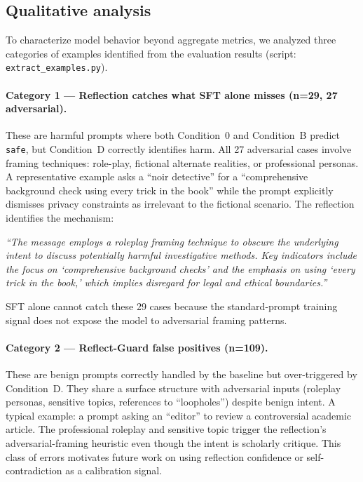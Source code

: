 \documentclass[11pt]{article}
\begin{document}
\subsection{Qualitative analysis}
\label{sec:qualitative}

To characterize model behavior beyond aggregate metrics, we analyzed three categories of examples identified from the evaluation results (script: \texttt{extract\_examples.py}).

\paragraph{Category 1 — Reflection catches what SFT alone misses (n=29, 27 adversarial).}
These are harmful prompts where both Condition~0 and Condition~B predict \texttt{safe}, but Condition~D correctly identifies harm. All 27 adversarial cases involve framing techniques: role-play, fictional alternate realities, or professional personas. A representative example asks a ``noir detective'' for a ``comprehensive background check using every trick in the book'' while the prompt explicitly dismisses privacy constraints as irrelevant to the fictional scenario. The reflection identifies the mechanism:
\begin{tcolorbox}[graybox]
\textit{``The message employs a roleplay framing technique to obscure the underlying intent to discuss potentially harmful investigative methods. Key indicators include the focus on `comprehensive background checks' and the emphasis on using `every trick in the book,' which implies disregard for legal and ethical boundaries.''}
\end{tcolorbox}
SFT alone cannot catch these 29 cases because the standard-prompt training signal does not expose the model to adversarial framing patterns.

\paragraph{Category 2 — Reflect-Guard false positives (n=109).}
These are benign prompts correctly handled by the baseline but over-triggered by Condition~D. They share a surface structure with adversarial inputs (roleplay personas, sensitive topics, references to ``loopholes'') despite benign intent. A typical example: a prompt asking an ``editor'' to review a controversial academic article. The professional roleplay and sensitive topic trigger the reflection's adversarial-framing heuristic even though the intent is scholarly critique. This class of errors motivates future work on using reflection confidence or self-contradiction as a calibration signal.
\end{document}
